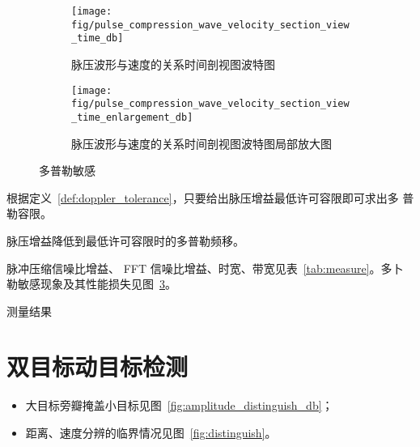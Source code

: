 \documentclass[../main]{subfiles}
\begin{document}
\begin{figure}[htbp]
  \centering
  \begin{subfigure}[htbp]{0.45\linewidth}
    \centering
    \texttt{[image: fig/pulse\_compression\_wave\_velocity\_section\_view\_time\_db]}
    \caption{脉压波形与速度的关系时间剖视图波特图}%
    \label{fig:pulse_compression_wave_velocity_section_view_time_db}
  \end{subfigure}
  \quad
  \begin{subfigure}[htbp]{0.45\linewidth}
    \centering
    \texttt{[image: fig/pulse\_compression\_wave\_velocity\_section\_view\_time\_enlargement\_db]}
    \caption{脉压波形与速度的关系时间剖视图波特图局部放大图}%
    \label{fig:pulse_compression_wave_velocity_section_view_time_enlargement_db}
  \end{subfigure}
    \caption{多普勒敏感}%
    \label{fig:doppler_sensitivity}
\end{figure}

根据定义~\ref{def:doppler_tolerance}，只要给出脉压增益最低许可容限即可求出多
普勒容限。

\begin{definition}[多普勒容限]%
  \label{def:doppler_tolerance}
  脉压增益降低到最低许可容限时的多普勒频移。
\end{definition}

\begin{Answer}[ref = ex:3]
  脉冲压缩信噪比增益、 FFT 信噪比增益、时宽、带宽见表~\ref{tab:measure}。多卜
  勒敏感现象及其性能损失见图~\ref{fig:doppler_sensitivity}。
\end{Answer}

\begin{table}[htbp]
  \centering
  \caption{测量结果}%
  \label{tab:measure}
\end{table}

\section{双目标动目标检测}%
\label{sec:double_mtd}

\begin{Answer}[ref = ex:4]
  \begin{itemize}
    \item 大目标旁瓣掩盖小目标见图~\ref{fig:amplitude_distinguish_db}；
    \item 距离、速度分辨的临界情况见图~\ref{fig:distinguish}。
  \end{itemize}
\end{Answer}
\end{document}
